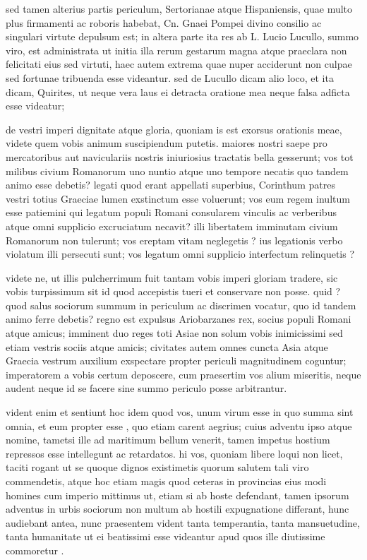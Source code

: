  sed tamen alterius partis periculum, Sertorianae atque Hispaniensis, quae multo plus firmamenti ac roboris habebat, Cn. Gnaei Pompei divino consilio ac singulari virtute depulsum est; in altera parte ita res ab L. Lucio Lucullo, summo viro, est administrata ut initia illa rerum gestarum magna atque praeclara non felicitati eius sed virtuti, haec autem extrema quae nuper acciderunt non culpae sed fortunae tribuenda esse videantur. sed de Lucullo dicam alio loco, et ita dicam, Quirites, ut neque vera laus ei detracta oratione mea neque falsa adficta esse videatur;

 de vestri imperi dignitate atque gloria, quoniam is est exorsus orationis meae, videte quem vobis animum suscipiendum putetis. maiores nostri saepe pro mercatoribus aut naviculariis nostris iniuriosius tractatis bella gesserunt; vos tot milibus civium Romanorum uno nuntio atque uno tempore necatis quo tandem animo esse debetis? legati quod erant appellati superbius, Corinthum patres vestri totius Graeciae lumen exstinctum esse voluerunt; vos eum regem inultum esse patiemini qui legatum populi Romani consularem vinculis ac verberibus atque omni supplicio excruciatum necavit? illi libertatem imminutam civium Romanorum non tulerunt; vos ereptam vitam neglegetis ? ius legationis verbo violatum illi persecuti sunt; vos legatum omni supplicio interfectum relinquetis ?

 videte ne, ut illis pulcherrimum fuit tantam vobis imperi gloriam tradere, sic vobis turpissimum sit id quod accepistis tueri et conservare non posse. quid ? quod salus sociorum summum in periculum ac discrimen vocatur, quo id tandem animo ferre debetis? regno est expulsus Ariobarzanes rex, socius populi Romani atque amicus; imminent duo reges toti Asiae non solum vobis inimicissimi sed etiam vestris sociis atque amicis; civitates autem omnes cuncta Asia atque Graecia vestrum auxilium exspectare propter periculi magnitudinem coguntur; imperatorem a vobis certum deposcere, cum praesertim vos alium miseritis, neque audent neque id se facere sine summo periculo posse arbitrantur.

 vident enim et sentiunt hoc idem quod vos, unum virum esse in quo summa sint omnia, et eum propter esse , quo etiam carent aegrius; cuius adventu ipso atque nomine, tametsi ille ad maritimum bellum venerit, tamen impetus hostium repressos esse intellegunt ac retardatos. hi vos, quoniam libere loqui non licet, taciti rogant ut se quoque dignos existimetis quorum salutem tali viro commendetis, atque hoc etiam magis quod ceteras in provincias eius modi homines cum imperio mittimus ut, etiam si ab hoste defendant, tamen ipsorum adventus in urbis sociorum non multum ab hostili expugnatione differant, hunc audiebant antea, nunc praesentem vident tanta temperantia, tanta mansuetudine, tanta humanitate ut ei beatissimi esse videantur apud quos ille diutissime commoretur .

